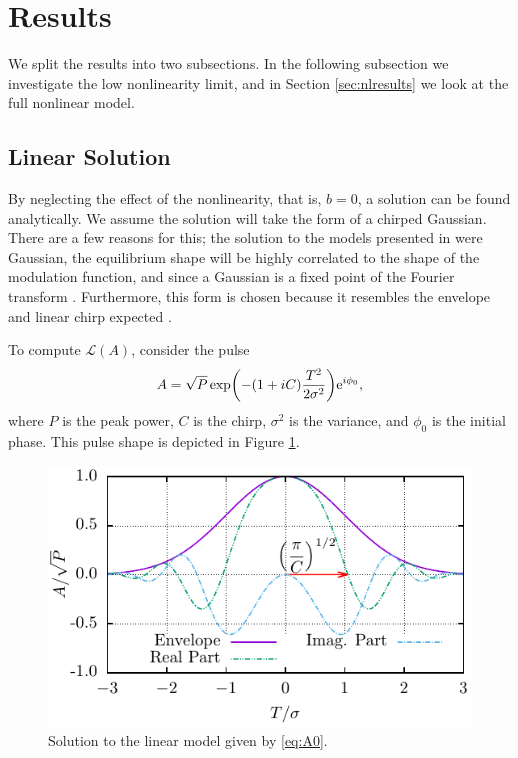 \documentclass[10pt,twocolumn,a4paper]{article}
\let\originalleft\left
\let\originalright\right
\renewcommand{\left}{\mathopen{}\mathclose\bgroup\originalleft}
\renewcommand{\right}{\aftergroup\egroup\originalright}
\begin{document}
\section{Results}
We split the results into two subsections. In the following subsection we investigate the low nonlinearity limit, and in Section \ref{sec:nlresults} we look at the full nonlinear model.

\subsection{Linear Solution}
By neglecting the effect of the nonlinearity, that is, $b = 0$, a solution can be found analytically. We assume the solution will take the form of a chirped Gaussian. There are a few reasons for this; the solution to the models presented in \cite{cutler1955, siegman1969, kuizenga1970a, martinez1984, martinez1985} were Gaussian, the equilibrium shape will be highly correlated to the shape of the modulation function, and since a Gaussian is a fixed point of the Fourier transform \cite{gradshteyn2007}. Furthermore, this form is chosen because it resembles the envelope and linear chirp expected \cite{burgoyne2014, haus1975, haus1996, haus2000, usechak2005}.

To compute $\mathcal{L}(A)$, consider the pulse
\begin{align}
	A = \sqrt{P} \exp \left( -(1 + iC) \frac{T^2}{2 \sigma^2} \right) \textrm{e}^{i \phi_0},
	\label{eq:A0}
\end{align}
where $P$ is the peak power, $C$ is the chirp, $\sigma^2$ is the variance, and $\phi_0$ is the initial phase. This pulse shape is depicted in Figure \ref{fig:samplegauss}.

\begin{figure}[tbp]
	\includegraphics{Sample_Gauss}
	\caption{Solution to the linear model given by \eqref{eq:A0}.}
	\label{fig:samplegauss}
\end{figure}
\end{document}
